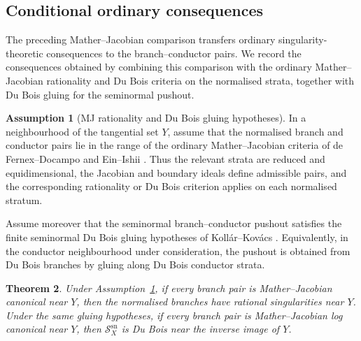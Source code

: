 \documentclass[11pt]{amsart}
\numberwithin{equation}{section}
\theoremstyle{plain}
\newtheorem{Theorem}{Theorem}[section]
\theoremstyle{definition}
\newtheorem{Assumption}[Theorem]{Assumption}
\newcommand{\sn}{\mathrm{sn}}
\newcommand{\sS}{\mathscr S}
\begin{document}
\subsection{Conditional ordinary consequences}

The preceding Mather--Jacobian comparison transfers ordinary
singularity-theoretic consequences to the branch--conductor pairs.  We record
the consequences obtained by combining this comparison with the ordinary
Mather--Jacobian rationality and Du Bois criteria on the normalised strata,
together with Du Bois gluing for the seminormal pushout.

\begin{Assumption}[MJ rationality and Du Bois gluing hypotheses]
\label{ass:mj-db-gluing}
In a neighbourhood of the tangential set \(Y\), assume that the normalised
branch and conductor pairs lie in the range of the ordinary
Mather--Jacobian criteria of de Fernex--Docampo and Ein--Ishii
\cite{dFD,EI}.  Thus the relevant strata are reduced and equidimensional,
the Jacobian and boundary ideals define admissible pairs, and the
corresponding rationality or Du Bois criterion applies on each normalised
stratum.

Assume moreover that the seminormal branch--conductor pushout satisfies the
finite seminormal Du Bois gluing hypotheses of Koll\'ar--Kov\'acs
\cite{KollarKovacs}.  Equivalently, in the conductor neighbourhood under
consideration, the pushout is obtained from Du Bois branches by gluing along
Du Bois conductor strata.
\end{Assumption}

\begin{Theorem}
\label{thm:rational-dubois}
Under Assumption~\ref{ass:mj-db-gluing}, if every branch pair is
Mather--Jacobian canonical near \(Y\), then the normalised branches have
rational singularities near \(Y\).  Under the same gluing hypotheses, if
every branch pair is Mather--Jacobian log canonical near \(Y\), then
\(\sS_X^{\sn}\) is Du Bois near the inverse image of \(Y\).
\end{Theorem}
\end{document}
